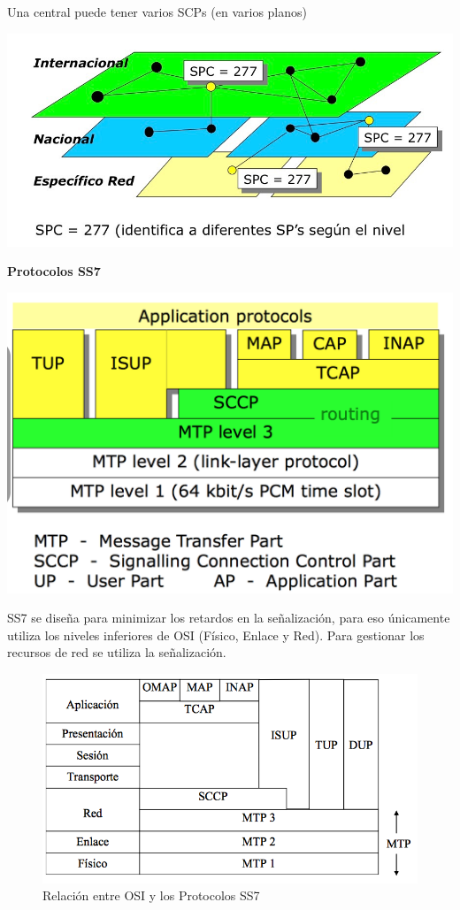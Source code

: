 \documentclass[10pt,portrait, twocolumn]{article}
\begin{document}
Una central puede tener varios SCPs (en varios planos)

	\begin{center}
		\includegraphics[scale = 0.2]{NivelesSS7}
	\end{center}

\textbf{Protocolos SS7}

	\begin{center}
		\includegraphics[scale = 0.3]{SS72}
	\end{center}

SS7 se diseña para minimizar los retardos en la señalización, para eso únicamente utiliza los niveles inferiores de OSI (Físico, Enlace y Red). Para gestionar los recursos de red se utiliza la señalización.
	
	\begin{figure}[!ht]
 		\centering
  		 \includegraphics[scale = 0.4]{images/SS7OSI}
		\caption{Relación entre OSI y los Protocolos SS7}
	\end{figure}
\end{document}
